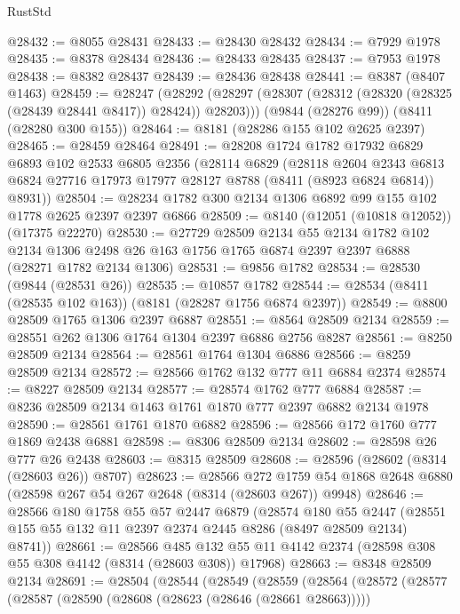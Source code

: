 \begin{lexlean}{RustStd}
\begin{coremodule}
@28432 := @8055 @28431
@28433 := @28430 @28432
@28434 := @7929 @1978
@28435 := @8378 @28434
@28436 := @28433 @28435
@28437 := @7953 @1978
@28438 := @8382 @28437
@28439 := @28436 @28438
@28441 := @8387 (@8407 @1463)
@28459 := @28247
    (@28292 (@28297 (@28307 (@28312 (@28320 (@28325 (@28439 @28441 @8417)) @28424)) @28203)))
    (@9844 (@28276 @99))
    (@8411 (@28280 @300 @155))
@28464 := @8181 (@28286 @155 @102 @2625 @2397)
@28465 := @28459 @28464
@28491 := @28208
    @1724
    @1782
    @17932
    @6829
    @6893
    @102
    @2533
    @6805
    @2356
    (@28114
      @6829
      (@28118
        @2604
        @2343
        @6813
        @6824
        @27716
        @17973
        @17977
        @28127
        @8788
        (@8411 (@8923 @6824 @6814))
        @8931))
@28504 := @28234 @1782 @300 @2134 @1306 @6892 @99 @155 @102 @1778 @2625 @2397 @2397 @6866
@28509 := @8140 (@12051 (@10818 @12052)) (@17375 @22270)
@28530 := @27729
    @28509
    @2134
    @55
    @2134
    @1782
    @102
    @2134
    @1306
    @2498
    @26
    @163
    @1756
    @1765
    @6874
    @2397
    @2397
    @6888
    (@28271 @1782 @2134 @1306)
@28531 := @9856 @1782
@28534 := @28530 (@9844 (@28531 @26))
@28535 := @10857 @1782
@28544 := @28534 (@8411 (@28535 @102 @163)) (@8181 (@28287 @1756 @6874 @2397))
@28549 := @8800 @28509 @1765 @1306 @2397 @6887
@28551 := @8564 @28509 @2134
@28559 := @28551 @262 @1306 @1764 @1304 @2397 @6886 @2756 @8287
@28561 := @8250 @28509 @2134
@28564 := @28561 @1764 @1304 @6886
@28566 := @8259 @28509 @2134
@28572 := @28566 @1762 @132 @777 @11 @6884 @2374
@28574 := @8227 @28509 @2134
@28577 := @28574 @1762 @777 @6884
@28587 := @8236 @28509 @2134 @1463 @1761 @1870 @777 @2397 @6882 @2134 @1978
@28590 := @28561 @1761 @1870 @6882
@28596 := @28566 @172 @1760 @777 @1869 @2438 @6881
@28598 := @8306 @28509 @2134
@28602 := @28598 @26 @777 @26 @2438
@28603 := @8315 @28509
@28608 := @28596 (@28602 (@8314 (@28603 @26)) @8707)
@28623 := @28566
    @272
    @1759
    @54
    @1868
    @2648
    @6880
    (@28598 @267 @54 @267 @2648 (@8314 (@28603 @267)) @9948)
@28646 := @28566
    @180
    @1758
    @55
    @57
    @2447
    @6879
    (@28574
      @180
      @55
      @2447
      (@28551 @155 @55 @132 @11 @2397 @2374 @2445 @8286 (@8497 @28509 @2134) @8741))
@28661 := @28566
    @485
    @132
    @55
    @11
    @4142
    @2374
    (@28598 @308 @55 @308 @4142 (@8314 (@28603 @308)) @17968)
@28663 := @8348 @28509 @2134
@28691 := @28504
    (@28544
      (@28549
        (@28559
          (@28564
            (@28572
              (@28577
                (@28587
                  (@28590 (@28608 (@28623 (@28646 (@28661 @28663)))))

\end{coremodule}
\end{lexlean}
